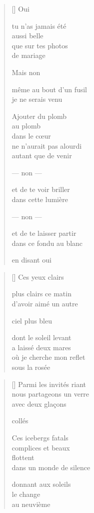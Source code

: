 \documentclass[11pt,a4paper]{book}
\begin{document}
\begin{verse}[\versewidth]
  Oui

  tu n'as jamais été \\
  aussi belle \\
  que sur tes photos \\
  de mariage

  Mais non

  même au bout d'un fusil \\
  je ne serais venu

  Ajouter du plomb \\
  au plomb \\
  dans le cœur \\
  ne n'aurait pas alourdi \\
  autant que de venir

  --- non ---

  et de te voir briller \\
  dans cette lumière

  --- non ---

  et de te laisser partir \\
  dans ce fondu au blanc

  en disant oui
\end{verse}

\newpage


\settowidth{\versewidth}{où je cherche mon reflet}

\bigskip

\begin{verse}[\versewidth]
  Ces yeux clairs

  plus clairs ce matin \\
  d'avoir aimé un autre

  ciel plus bleu

  dont le soleil levant \\
  a laissé deux mares \\
  où je cherche mon reflet \\
  sous la rosée
\end{verse}

\newpage


\settowidth{\versewidth}{Ils ne sont pas différents}

\bigskip

\begin{verse}[\versewidth]
  Parmi les invités riant \\
  nous partageons un verre \\
  avec deux glaçons

  collés

  Ces icebergs fatals \\
  complices et beaux \\
  flottent \\
  dans un monde de silence

  donnant aux soleils \\
  le change \\
  au neuvième
\end{verse}
\end{document}
